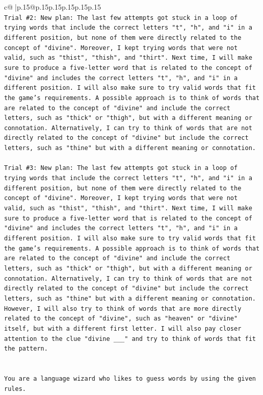 \documentclass{article}
\begin{document}
{\begin{supertabular}{c@{$\;$}|p{.15\linewidth}@{}p{.15\linewidth}p{.15\linewidth}p{.15\linewidth}p{.15\linewidth}p{.15\linewidth}}
{{{\\ 
\texttt{Trial \#2: New plan: The last few attempts got stuck in a loop of trying words that include the correct letters "t", "h", and "i" in a different position, but none of them were directly related to the concept of "divine". Moreover, I kept trying words that were not valid, such as "thist", "thish", and "thirt". Next time, I will make sure to produce a five{-}letter word that is related to the concept of "divine" and includes the correct letters "t", "h", and "i" in a different position. I will also make sure to try valid words that fit the game's requirements. A possible approach is to think of words that are related to the concept of "divine" and include the correct letters, such as "thick" or "thigh", but with a different meaning or connotation. Alternatively, I can try to think of words that are not directly related to the concept of "divine" but include the correct letters, such as "thine" but with a different meaning or connotation.} \\
\\ 
\texttt{Trial \#3: New plan: The last few attempts got stuck in a loop of trying words that include the correct letters "t", "h", and "i" in a different position, but none of them were directly related to the concept of "divine". Moreover, I kept trying words that were not valid, such as "thist", "thish", and "thirt". Next time, I will make sure to produce a five{-}letter word that is related to the concept of "divine" and includes the correct letters "t", "h", and "i" in a different position. I will also make sure to try valid words that fit the game's requirements. A possible approach is to think of words that are related to the concept of "divine" and include the correct letters, such as "thick" or "thigh", but with a different meaning or connotation. Alternatively, I can try to think of words that are not directly related to the concept of "divine" but include the correct letters, such as "thine" but with a different meaning or connotation. However, I will also try to think of words that are more directly related to the concept of "divine", such as "heaven" or "divine" itself, but with a different first letter. I will also pay closer attention to the clue "divine \_\_\_" and try to think of words that fit the pattern.} \\
\\ 
\\ 
\texttt{You are a language wizard who likes to guess words by using the given rules.} \\
\\ 
}}}
\end{supertabular}}
\end{document}

